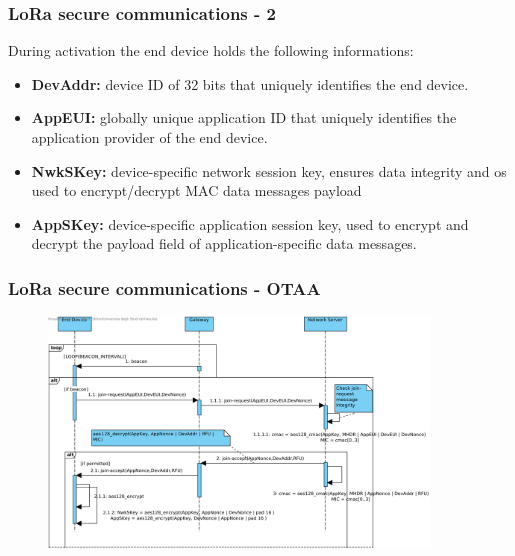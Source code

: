 \begin{frame}[fragile]
  \frametitle{LoRa secure communications - 2}
  During activation the end device holds the following informations:
  \begin{itemize}
      \item \textbf{DevAddr:} device ID of 32 bits that uniquely identifies the end device.
      \item \textbf{AppEUI:} globally unique application ID that uniquely identifies the application provider of the end device.
      \item \textbf{NwkSKey:} device-specific network session key, ensures data integrity and os used to encrypt/decrypt MAC data messages payload
      \item \textbf{AppSKey:} device-specific application session key, used to encrypt and decrypt the payload field of application-specific data messages.
  \end{itemize}
\end{frame}

\begin{frame}[fragile]
  \frametitle{LoRa secure communications - OTAA}
 \begin{figure}
  \centering
  \includegraphics[width=0.9\textwidth]{img/lora_secure.png}
  \end{figure}
\end{frame}